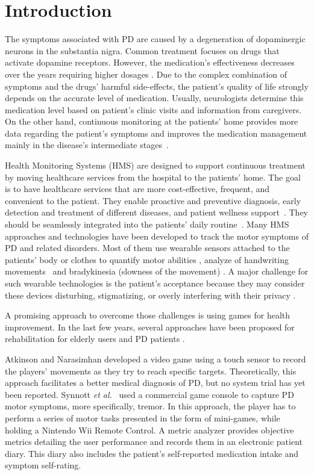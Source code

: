 \documentclass[10pt, conference, compsocconf]{IEEEtran}
\begin{document}
\section{Introduction}

The symptoms associated with PD are caused by a degeneration of dopaminergic neurons in the substantia nigra. Common treatment focuses on drugs that activate dopamine receptors. However, the medication's effectiveness decreases over the years requiring higher dosages \cite{national2006parkinson}. Due to the complex combination of symptoms and the drugs' harmful side-effects, the patient's quality of life strongly depends on the accurate level of medication. Usually, neurologists determine this medication level based on patient's clinic visits and information from caregivers. On the other hand, continuous monitoring at the patients' home provides more data regarding the patient's symptoms and improves the medication management mainly in the disease's intermediate stages~\cite{national2006parkinson}.

Health Monitoring Systems (HMS) are designed to support continuous treatment by moving healthcare services from the hospital to the patients' home. The goal is to have healthcare services that are more cost-effective, frequent, and convenient to the patient. They enable proactive and preventive diagnosis, early detection and treatment of different diseases, and patient wellness support~\cite{cbmshms2015}. They should be seamlessly integrated into the patients' daily routine~\cite{alemdar2015}. Many HMS approaches and technologies have been developed to track the motor symptoms of PD and related disorders. Most of them use wearable sensors attached to the patients' body or clothes to quantify motor abilities \cite{cbmsparkglove2015}, analyze of handwriting movements~\cite{cbmshandwriting2015} and bradykinesia (slowness of the movement) \cite{ambulatory2010}. A major challenge for such wearable technologies is the patient's acceptance because they may consider these devices disturbing, stigmatizing, or overly interfering with their privacy \cite{alemdar2015}.

A promising approach to overcome those challenges is using games for health improvement. In the last few years, several approaches have been proposed for rehabilitation for elderly users \cite{brox11} and PD patients \cite{atkinson2010,synnott_wiipd_2012}. 

Atkinson and Narasimhan \cite{atkinson2010} developed a video game using a touch sensor to record the players' movements as they try to reach specific targets. Theoretically, this approach facilitates a better medical diagnosis of PD, but no system trial has yet been reported. Synnott \textit{et al.}~\cite{synnott_wiipd_2012} used a commercial game console to capture PD motor symptoms, more specifically, tremor. In this approach, the player has to perform a series of motor tasks presented in the form of mini-games, while holding a Nintendo Wii Remote Control. A metric analyzer provides objective metrics detailing the user performance and records them in an electronic patient diary. This diary also includes the patient's self-reported medication intake and symptom self-rating. 
\end{document}

